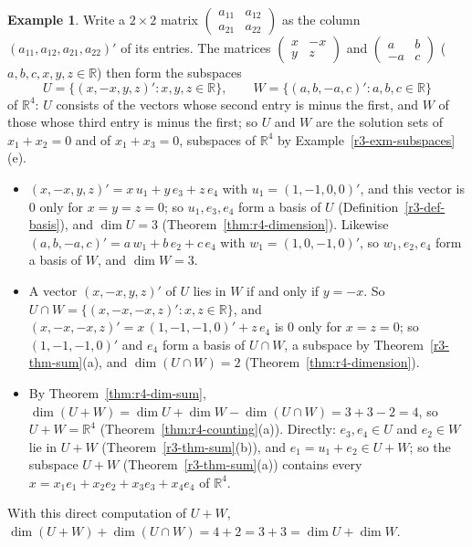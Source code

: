 \documentclass[12pt]{article}
\newcommand{\R}{\mathbb R}
\theoremstyle{definition}
\newtheorem{example}[theorem]{Example}
\begin{document}
\begin{example}\label{exm:r4-dim-sum}
Write a \(2\times2\) matrix \(\left(\begin{smallmatrix}a_{11}&a_{12}\\a_{21}&a_{22}\end{smallmatrix}\right)\) as the
column \((a_{11},a_{12},a_{21},a_{22})'\) of its entries. The matrices
\(\left(\begin{smallmatrix}x&-x\\y&z\end{smallmatrix}\right)\) and
\(\left(\begin{smallmatrix}a&b\\-a&c\end{smallmatrix}\right)\) (\(a,b,c,x,y,z\in\R\)) then form the subspaces
\[
U=\{(x,-x,y,z)':x,y,z\in\R\},\qquad W=\{(a,b,-a,c)':a,b,c\in\R\}
\]
of \(\R^4\): \(U\) consists of the vectors whose second entry is minus the first, and \(W\) of those whose third entry
is minus the first; so \(U\) and \(W\) are the solution sets of \(x_1+x_2=0\) and of \(x_1+x_3=0\), subspaces of
\(\R^4\) by Example~\ref{r3-exm-subspaces}(e).
\begin{itemize}
\item \((x,-x,y,z)'=x\,u_1+y\,e_3+z\,e_4\) with \(u_1=(1,-1,0,0)'\), and this vector is \(0\) only for
\(x=y=z=0\); so \(u_1,e_3,e_4\) form a basis of \(U\) (Definition~\ref{r3-def-basis}), and \(\dim U=3\)
(Theorem~\ref{thm:r4-dimension}). Likewise
\((a,b,-a,c)'=a\,w_1+b\,e_2+c\,e_4\) with \(w_1=(1,0,-1,0)'\), so \(w_1,e_2,e_4\) form a basis of \(W\), and
\(\dim W=3\).
\item A vector \((x,-x,y,z)'\) of \(U\) lies in \(W\) if and only if \(y=-x\). So
\(U\cap W=\{(x,-x,-x,z)':x,z\in\R\}\), and \((x,-x,-x,z)'=x\,(1,-1,-1,0)'+z\,e_4\) is \(0\) only for \(x=z=0\);
so \((1,-1,-1,0)'\) and \(e_4\) form a basis of \(U\cap W\), a subspace by Theorem~\ref{r3-thm-sum}(a),
and \(\dim(U\cap W)=2\) (Theorem~\ref{thm:r4-dimension}).
\item By Theorem~\ref{thm:r4-dim-sum}, \(\dim(U+W)=\dim U+\dim W-\dim(U\cap W)=3+3-2=4\), so \(U+W=\R^4\)
(Theorem~\ref{thm:r4-counting}(a)). Directly: \(e_3,e_4\in U\) and \(e_2\in W\) lie in \(U+W\)
(Theorem~\ref{r3-thm-sum}(b)), and \(e_1=u_1+e_2\in U+W\); so the
subspace \(U+W\) (Theorem~\ref{r3-thm-sum}(a)) contains every \(x=x_1e_1+x_2e_2+x_3e_3+x_4e_4\) of \(\R^4\).
\end{itemize}
With this direct computation of \(U+W\), \(\dim(U+W)+\dim(U\cap W)=4+2=3+3=\dim U+\dim W\).
\end{example}
\end{document}

